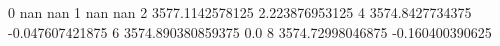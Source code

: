 0 nan nan
1 nan nan
2 3577.1142578125 2.223876953125
4 3574.8427734375 -0.047607421875
6 3574.890380859375 0.0
8 3574.72998046875 -0.160400390625
